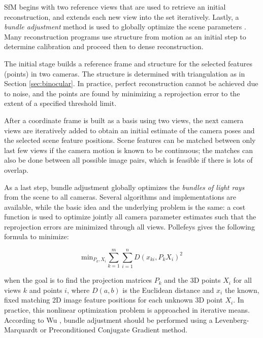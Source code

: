 SfM begins with two reference views that are used to retrieve an initial reconstruction, and extends each new view into the set iteratively.
Lastly, a \emph{bundle adjustment} method is used to globally optimize the scene parameters \cite{triggs2000bundle}.
Many reconstruction programs use structure from motion as an initial step to determine calibration and proceed then to dense reconstruction.

The initial stage builds a reference frame and structure for the selected features (points) in two cameras.
The structure is determined with triangulation as in Section \ref{sec:binocular}.
In practice, perfect reconstruction cannot be achieved due to noise, and the points are found by minimizing a reprojection error to the extent of a specified threshold limit.

After a coordinate frame is built as a basis using two views, the next camera views are iteratively added to obtain an initial estimate of the camera poses and the selected scene feature positions.
Scene features can be matched between only last few views if the camera motion is known to be continuous;
the matches can also be done between all possible image pairs, which is feasible if there is lots of overlap.

As a last step, bundle adjustment globally optimizes the \emph{bundles of light rays} from the scene to all cameras.
Several algorithms and implementations are available, while the basic idea and the underlying problem is the same:
a cost function is used to optimize jointly all camera parameter estimates such that the reprojection errors are minimized through all views.
Pollefeys \cite{pollefeys2004visual} gives the following formula to minimize:

\begin{equation}
	\text{min}_{P_k, X_i} \sum_{k=1}^m \sum_{i=1}^n D(x_{ki}, P_k X_i)^2
\end{equation}

when the goal is to find the projection matrices $P_k$ and the 3D points $X_i$ for all views $k$ and points $i$, where $D(a,b)$ is the Euclidean distance and $x_i$ the known, fixed matching 2D image feature positions for each unknown 3D point $X_i$.
In practice, this nonlinear optimization problem is approached in iterative means.
According to Wu \cite{wu2013towards}, bundle adjustment should be performed using a Levenberg-Marquardt or Preconditioned Conjugate Gradient method.

